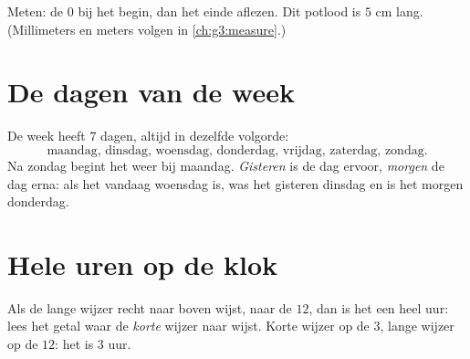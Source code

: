 \begin{omfigure}

{\small Meten: de $0$ bij het begin, dan het einde aflezen. Dit
potlood is $5$ cm lang. (Millimeters en meters volgen in
\cref{ch:g3:measure}.)}
\end{omfigure}

\section{De dagen van de week}

\begin{example}\label{ex:g1:measure:days}
De week heeft $7$ dagen, altijd in dezelfde volgorde:
\[
\text{maandag, dinsdag, woensdag, donderdag, vrijdag, zaterdag,
zondag.}
\]
Na zondag begint het weer bij maandag. \emph{Gisteren} is de dag
ervoor, \emph{morgen} de dag erna: als het vandaag woensdag is, was het
gisteren dinsdag en is het morgen donderdag.
\end{example}

\section{Hele uren op de klok}

\begin{method}\label{met:g1:measure:clock}
Als de lange wijzer recht naar boven wijst, naar de $12$, dan is het een
heel uur: lees het getal waar de \emph{korte} wijzer naar wijst. Korte
wijzer op de $3$, lange wijzer op de $12$: het is $3$ uur.
\end{method}

